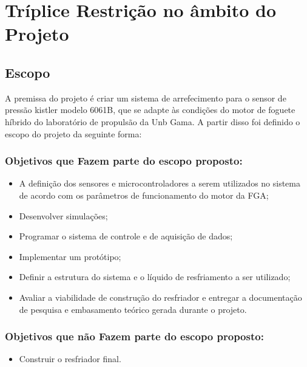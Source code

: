 \chapter{Tríplice Restrição no âmbito do Projeto}

\section{Escopo}

A premissa do projeto é criar um sistema de arrefecimento para o sensor de pressão kistler modelo 6061B, que se adapte às condições do motor de foguete híbrido do laboratório de propulsão da Unb Gama. A partir disso foi definido o escopo do projeto da seguinte forma:

\subsection{Objetivos que Fazem parte do escopo proposto:}

\begin{itemize}

	\item A definição dos sensores e microcontroladores a serem utilizados no sistema de acordo com os parâmetros de funcionamento do motor da FGA;

	\item Desenvolver simulações;

	\item Programar o sistema de controle e de aquisição de dados;

	\item Implementar um protótipo;

	\item Definir a estrutura do sistema e o líquido de resfriamento a ser utilizado;

	\item Avaliar a viabilidade de construção do resfriador e entregar a documentação de pesquisa e embasamento teórico gerada durante o projeto.

\end{itemize} 

\subsection{Objetivos que não Fazem parte do escopo proposto:}

\begin{itemize}

	\item Construir o resfriador final.

\end{itemize}

